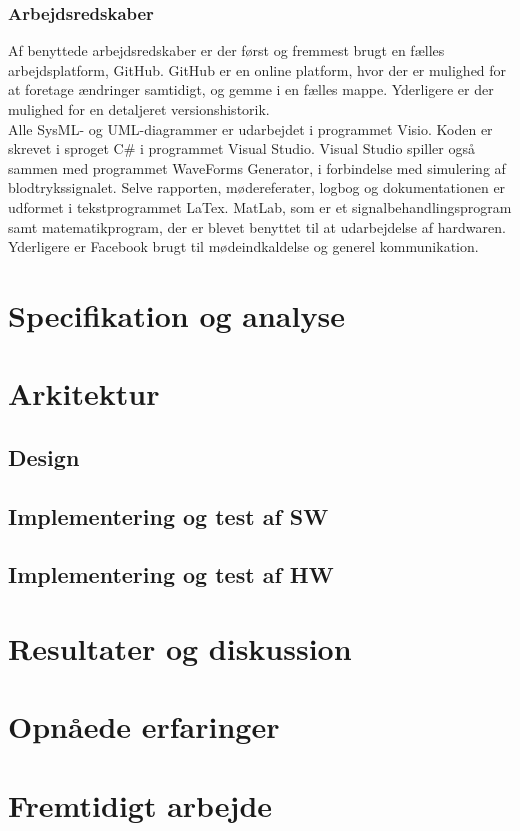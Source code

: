 \subsubsection{Arbejdsredskaber} 
Af benyttede arbejdsredskaber er der først og fremmest brugt en fælles arbejdsplatform, GitHub. GitHub er en online platform, hvor der er mulighed for at foretage ændringer samtidigt, og gemme i en fælles mappe. Yderligere er der mulighed for en detaljeret versionshistorik.\\
Alle SysML- og UML-diagrammer er udarbejdet i programmet Visio. Koden er skrevet i sproget C\# i programmet Visual Studio. Visual Studio spiller også sammen med programmet WaveForms Generator, i forbindelse med simulering af blodtrykssignalet. Selve rapporten, mødereferater, logbog og dokumentationen er udformet i tekstprogrammet LaTex. MatLab, som er et signalbehandlingsprogram samt matematikprogram, der er blevet benyttet til at udarbejdelse af hardwaren. Yderligere er Facebook brugt til mødeindkaldelse og generel kommunikation.




\section{Specifikation og analyse}

\section{Arkitektur}
\subsection{Design}
\subsection{Implementering og test af SW}
\subsection{Implementering og test af HW}

\section{Resultater og diskussion}

\section{Opnåede erfaringer}

\section{Fremtidigt arbejde}


